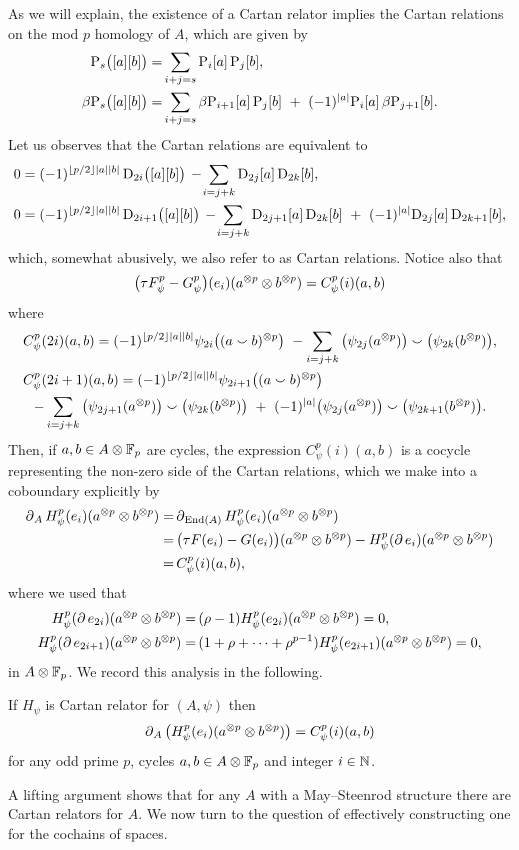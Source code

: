 As we will explain, the existence of a Cartan relator implies the Cartan relations on the mod $p$ homology of $A$, which are given by
\begin{align*}
	\mathrm{P}_s\big([a][b]\big) =&
	\sum_{i+j=s} \mathrm{P}_i[a] \, \mathrm{P}_j[b], \\
	\beta\mathrm{P}_s\big([a][b]\big) =&
	\sum_{i+j=s} \beta\mathrm{P}_{i+1}[a] \, \mathrm{P}_j[b] \ +\ (-1)^{\lvert a\rvert} \mathrm{P}_i[a] \, \beta\mathrm{P}_{j+1}[b].
\end{align*}
Let us observes that the Cartan relations are equivalent to
\begin{align*}
	0 &= (-1)^{\floor{p/2}\bars{a}\bars{b}} \, \rD_{2i}\big([a][b]\big) \,-\!
	\sum_{i=j+k} \rD_{2j}[a] \, \rD_{2k}[b], \\
	0 &= (-1)^{\floor{p/2}\bars{a}\bars{b}} \, \rD_{2i+1}\big([a][b]\big) \,-\!
	\sum_{i=j+k} \rD_{2j+1}[a] \, \rD_{2k}[b] \ +\ (-1)^{\bars{a}}\rD_{2j}[a] \, \rD_{2k+1}[b],
\end{align*}
which, somewhat abusively, we also refer to as Cartan relations.
Notice also that
\[
\big(\tau F_\psi^p - G_\psi^p\big)(e_i)(a^{\otimes p} \otimes b^{\otimes p}) = C^p_\psi(i)(a,b)
\]
where
\begin{multline*}
	C_\psi^p(2i)(a,b) = (-1)^{\floor{p/2}\bars{a}\bars{b}} \psi_{2i}\big((a \smallsmile b)^{\ot p}\big) \ -
	\sum_{i=j+k}\big(\psi_{2j}(a^{\ot p})\big) \smallsmile \big(\psi_{2k}(b^{\ot p})\big), \hfill \\
	C_\psi^p(2i+1)(a,b) = (-1)^{\floor{p/2}\bars{a}\bars{b}} \psi_{2i+1}\big((a \smallsmile b)^{\ot p}\big) \hfill \\ -
	\sum_{i=j+k} \big(\psi_{2j+1}(a^{\ot p})\big) \smallsmile \big(\psi_{2k}(b^{\ot p})\big)\ +\
	(-1)^{\bars{a}}\big(\psi_{2j}(a^{\ot p})\big) \smallsmile \big(\psi_{2k+1}(b^{\ot p})\big).
\end{multline*}
Then, if $a,b \in A \otimes {\mathbb{F}_p}$ are cycles, the expression $C_\psi^p(i)(a,b)$ is a cocycle representing the non-zero side of the Cartan relations, which we make into a coboundary explicitly by
\begin{align*}
	\operatorname{\partial}_A H_\psi^p(e_i)(a^{\otimes p} \otimes b^{\otimes p}) =&
	\operatorname{\partial}_{\mathrm{End}(A)} H_\psi^p(e_i)(a^{\otimes p} \otimes b^{\otimes p}) \\ =& \,
	\big(\tau F(e_i) - G(e_i)\big)(a^{\otimes p} \otimes b^{\otimes p}) -
	H_\psi^p(\operatorname{\partial} e_i)(a^{\otimes p} \otimes b^{\otimes p}) \\ =&\,
	C^p_\psi(i)(a,b),
\end{align*}
where we used that
\begin{align*}
	H_\psi^p(\operatorname{\partial} e_{2i})(a^{\otimes p} \otimes b^{\otimes p}) =&\,
	(\rho - 1) H_\psi^p(e_{2i})(a^{\otimes p} \otimes b^{\otimes p}) = 0, \\
	H_\psi^p(\operatorname{\partial} e_{2i+1})(a^{\otimes p} \otimes b^{\otimes p}) =&\,
	(1+\rho+\dots+\rho^{p-1}) H_\psi^p(e_{2i+1})(a^{\otimes p} \otimes b^{\otimes p}) = 0,
\end{align*}
in $A \otimes {\mathbb{F}_p}$.
We record this analysis in the following.
\begin{theorem}
	If $H_\psi$ is Cartan relator for $(A, \psi)$ then
	\[
	\operatorname{\partial}_A \big(H_\psi^p(e_i)(a^{\otimes p} \otimes b^{\otimes p})\big) = C_\psi^p(i)(a, b)
	\]
	for any odd prime $p$, cycles $a,b \in A \otimes {\mathbb{F}_p}$ and integer $i \in \mathbb{N}$.
\end{theorem}

A lifting argument shows that for any $A$ with a May--Steenrod structure there are Cartan relators for $A$.
We now turn to the question of effectively constructing one for the cochains of spaces.
